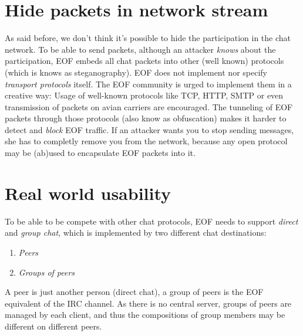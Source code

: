 \section{Hide packets in network stream}
As said before, we don't think it's possible to hide the participation in the
chat network. To be able to send packets, although an attacker \emph{knows}
about the participation, EOF embeds all chat packets into other (well known)
protocols (which is knows as steganography\cite{stegano-1}).
EOF does not implement nor specify \emph{transport protocols} itself.
The EOF community is urged to implement them in a creative way: Usage
of well-known protocols like TCP\cite{tcp-1}, HTTP\cite{http-1},
SMTP\cite{smtp-1} or even transmission of packets on avian
carriers\cite{avian-1} are encouraged. The tunneling of EOF packets through
those protocols (also know as obfuscation) makes it harder to detect
and \emph{block} EOF traffic.
If an attacker wants you to stop sending messages, she has to completly
remove you from the network, because any open protocol may be (ab)used to
encapsulate EOF packets into it.
\section{Real world usability}
To be able to be compete with other chat protocols, EOF needs
to support \emph{direct} and \emph{group chat}, which is
implemented by two different chat destinations:
\begin{enumerate}
\item \emph{Peers}
\item \emph{Groups of peers}
\end{enumerate}
A peer is just another person (direct chat), a group of peers is the EOF
equivalent of the IRC channel\cite{irc-1}. As there is no central server,
groups of peers are managed by each client, and thus the compositions of
group members may be different on different peers.

